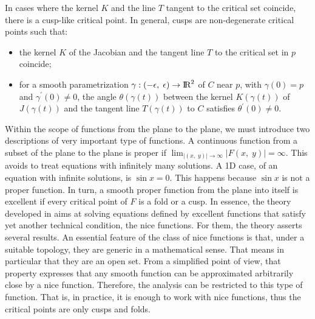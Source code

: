 \documentclass[journal=iecred,manuscript=article]{achemso}
\theoremstyle{definition}
\theoremstyle{remark}
\begin{document}
In cases where the kernel $ K $ and the line $ T $ tangent to the critical set coincide, there is a cusp-like critical point. In general,  cusps are non-degenerate critical points such that:
%
\begin{itemize}
\item the kernel $ K $ of the Jacobian and the tangent line $ T $ to the critical set in $ p $ coincide;
\item for a smooth parametrization $ \gamma : \left( -\epsilon, \; \epsilon \right) \to {\text{I\!R}}^2 $ of $ C $ near $ p $, with $ \gamma \left(0\right) = p $ and $ \gamma^{\prime} \left(0\right) \neq 0 $, the angle $ \theta\left(\gamma\left(t\right)\right) $ between the kernel $ K\left(\gamma\left(t\right)\right) $ of $ J\left(\gamma\left(t\right)\right) $ and the tangent line $ T\left(\gamma\left(t\right)\right) $ to $ C $ satisfies $ \theta^{\prime}\left(0\right) \neq 0 $.
\end{itemize}

Within the scope of  functions from the plane to the plane, we 
must introduce two descriptions of very important type of 
functions. 
A continuous function from a subset of the plane to the plane 
is proper if  $\lim_{\vert\left(x,\;y\right)\vert\to\infty} \vert F\left(x,\;y\right)\vert = \infty$. This avoids to
treat equations with infinitely many solutions. A 1D case, of an equation with infinite solutions, is $\sin x=0$. This happens because $\sin x$ is not a proper function. 
%
In turn, a smooth proper function from the plane into itself is excellent if every critical point of $ F $ is a fold or a cusp. In essence, the theory developed in \citet{malta} aims
at solving equations defined by excellent functions that 
satisfy yet another technical condition, the nice 
functions. For them, the theory 
asserts several results. 
An essential feature of the class of nice functions 
is that, under a suitable topology, they are generic
in a mathematical sense.
That means in particular
that they are an open set. From a simplified point of view, 
that property expresses that any smooth
function can be approximated arbitrarily close by a nice function. 
 Therefore,
the analysis can be restricted to this type of function.
That is, in practice, it is enough to work 
with nice functions, thus the critical points are only 
cusps and folds.


\end{document}

